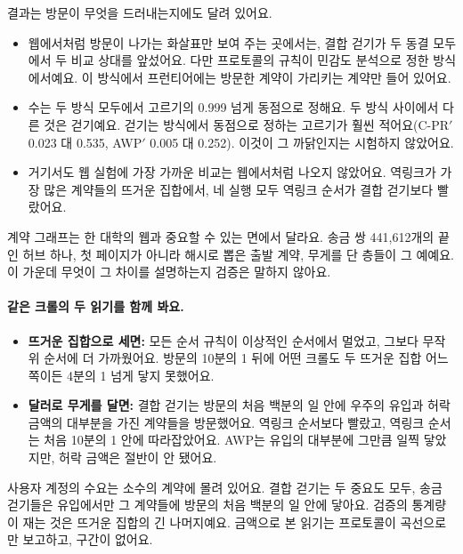 결과는 방문이 무엇을 드러내는지에도 달려 있어요.
\begin{itemize}
\item 웹에서처럼 방문이 나가는 화살표만 보여 주는 곳에서는, 결합 걷기가 두 동결 모두에서 두 비교 상대를 앞섰어요. 다만 프로토콜의 규칙이 민감도 분석으로 정한 방식에서예요. 이 방식에서 프런티어에는 방문한 계약이 가리키는 계약만 들어 있어요.
\item 수는 두 방식 모두에서 고르기의 0.999 넘게 동점으로 정해요. 두 방식 사이에서 다른 것은 걷기예요. 걷기는 \outm{} 방식에서 동점으로 정하는 고르기가 훨씬 적어요(C-PR$'$ 0.023 대 0.535, AWP$'$ 0.005 대 0.252). 이것이 그 까닭인지는 시험하지 않았어요.
\item 거기서도 웹 실험에 가장 가까운 비교는 웹에서처럼 나오지 않았어요. 역링크가 가장 많은 계약들의 뜨거운 집합에서, 네 실행 모두 역링크 순서가 결합 걷기보다 빨랐어요.
\end{itemize}
계약 그래프는 한 대학의 웹과 중요할 수 있는 면에서 달라요. 송금 쌍 441,612개의 끝인 허브 하나, 첫 페이지가 아니라 해시로 뽑은 출발 계약, 무게를 단 층들이 그 예예요. 이 가운데 무엇이 그 차이를 설명하는지 검증은 말하지 않아요.

\paragraph{같은 크롤의 두 읽기를 함께 봐요.}
\begin{itemize}
\item \textbf{뜨거운 집합으로 세면:} 모든 순서 규칙이 이상적인 순서에서 멀었고, 그보다 무작위 순서에 더 가까웠어요. 방문의 10분의 1 뒤에 어떤 크롤도 두 뜨거운 집합 어느 쪽이든 4분의 1 넘게 닿지 못했어요.
\item \textbf{달러로 무게를 달면:} 결합 걷기는 방문의 처음 백분의 일 안에 우주의 유입과 허락 금액의 대부분을 가진 계약들을 방문했어요. 역링크 순서보다 빨랐고, 역링크 순서는 처음 10분의 1 안에 따라잡았어요. AWP는 유입의 대부분에 그만큼 일찍 닿았지만, 허락 금액은 절반이 안 됐어요.
\end{itemize}
사용자 계정의 수요는 소수의 계약에 몰려 있어요. 결합 걷기는 두 중요도 모두, 송금 걷기들은 유입에서만 그 계약들에 방문의 처음 백분의 일 안에 닿아요. 검증의 통계량이 재는 것은 뜨거운 집합의 긴 나머지예요. 금액으로 본 읽기는 프로토콜이 곡선으로만 보고하고, 구간이 없어요.

